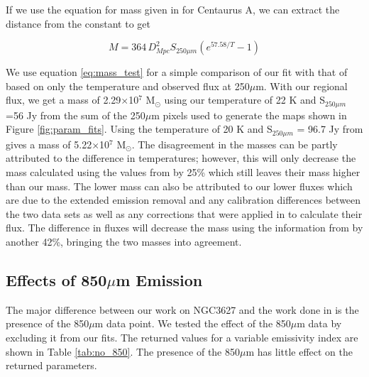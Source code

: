 If we use the equation for mass given in \cite{parkin2012} for Centaurus A, we can extract the distance from the constant to get 

\begin{equation}\label{eq:mass_test}
  M=364\,D^{2}_{Mpc}S_{250\mu m}\left(e^{57.58 / T} - 1\right)
\end{equation}

\noindent We use equation \ref{eq:mass_test} for a simple comparison of our fit with that of \cite{galametz2012} based on only the temperature and observed flux at 250$\mu$m.  With our regional flux, we get a mass of 2.29$\times$10$^{7}$ M$_\odot$ using our temperature of 22 K and S$_{250\mu m}$=56 Jy from the sum of the 250$\mu$m pixels used to generate the maps shown in Figure \ref{fig:param_fits}.  Using the temperature of 20 K and S$_{250\mu m}$ = 96.7 Jy from \cite{galametz2012} gives a mass of 5.22$\times$10$^7$ M$_\odot$.  The disagreement in the masses can be partly attributed to the difference in temperatures; however, this will only decrease the mass calculated using the values from \cite{galametz2012} by 25\% which still leaves their mass higher than our mass.  The lower mass can also be attributed to our lower fluxes which are due to the extended emission removal and any calibration differences between the two data sets as well as any corrections that were applied in \cite{galametz2012} to calculate their flux.  The difference in fluxes will decrease the mass using the information from \cite{galametz2012} by another 42\%, bringing the two masses into agreement.

\subsection{Effects of 850$\mu$m Emission}

The major difference between our work on NGC3627 and the work done in \cite{galametz2012} is the presence of the 850$\mu$m data point.  We tested the effect of the 850$\mu$m data by excluding it from our fits.  The returned values for a variable emissivity index are shown in Table \ref{tab:no_850}.  The presence of the 850$\mu$m has little effect on the returned parameters.  


